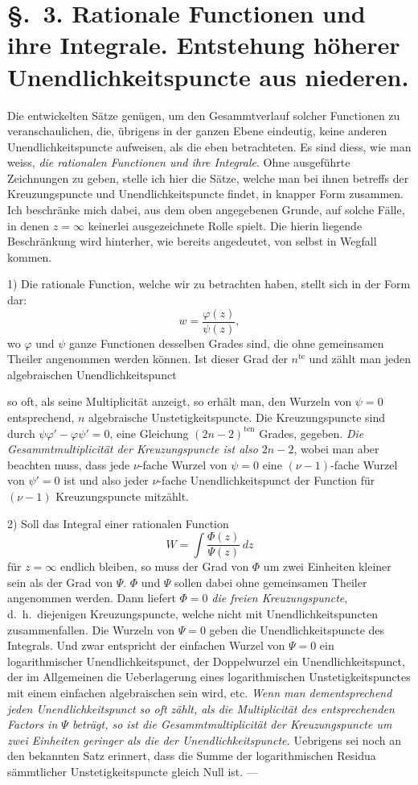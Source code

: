 \documentclass{article}
\begin{document}
\section*{§.~3. Rationale Functionen und ihre Integrale. Entstehung höherer Unendlichkeitspuncte aus niederen.}

Die entwickelten Sätze genügen, um den Gesammtverlauf solcher Functionen zu veranschaulichen, die, übrigens in der ganzen Ebene eindeutig, keine anderen Unendlichkeitspuncte aufweisen, als die eben betrachteten. Es sind diess, wie man weiss, \emph{die rationalen Functionen und ihre Integrale}. Ohne ausgeführte Zeichnungen zu geben, stelle ich hier die Sätze, welche man bei ihnen betreffs der Kreuzungspuncte und Unendlichkeitspuncte findet, in knapper Form zusammen. Ich beschränke mich dabei, aus dem oben angegebenen Grunde, auf solche Fälle, in denen $z = \infty$ keinerlei ausgezeichnete Rolle spielt. Die hierin liegende Beschränkung wird hinterher, wie bereits angedeutet, von selbst in Wegfall kommen.

1) Die rationale Function, welche wir zu betrachten haben, stellt sich in der Form dar:
\[ w = \frac{\varphi(z)}{\psi(z)}, \]
wo $\varphi$ und $\psi$ ganze Functionen desselben Grades sind, die ohne gemeinsamen Theiler angenommen werden können. Ist dieser Grad der $n^{\text{te}}$ und zählt man jeden algebraischen Unendlichkeitspunct

so oft, als seine Multiplicität anzeigt, so erhält man, den Wurzeln von $\psi = 0$ entsprechend, $n$ algebraische Unstetigkeitspuncte. Die Kreuzungspuncte sind durch $\psi\varphi' - \varphi\psi' = 0$, eine Gleichung $(2n - 2)^{\text{ten}}$ Grades, gegeben. \emph{Die Gesammtmultiplicität der Kreuzungspuncte ist also $2n - 2$}, wobei man aber beachten muss, dass jede $\nu$-fache Wurzel von $\psi = 0$ eine $(\nu - 1)$-fache Wurzel von $\psi' = 0$ ist und also jeder $\nu$-fache Unendlichkeitspunct der Function für $(\nu - 1)$ Kreuzungspuncte mitzählt.

2) Soll das Integral einer rationalen Function
\[ W = \int \frac{\Phi(z)}{\Psi(z)}\,dz \]
für $z = \infty$ endlich bleiben, so muss der Grad von $\Phi$ um zwei Einheiten kleiner sein als der Grad von $\Psi$. $\Phi$ und $\Psi$ sollen dabei ohne gemeinsamen Theiler angenommen werden. Dann liefert $\Phi = 0$ \emph{die freien Kreuzungspuncte}, d.\ h.\ diejenigen Kreuzungspuncte, welche nicht mit Unendlichkeitspuncten zusammenfallen. Die Wurzeln von $\Psi = 0$ geben die Unendlichkeitspuncte des Integrals. Und zwar entspricht der einfachen Wurzel von $\Psi = 0$ ein logarithmischer Unendlichkeitspunct, der Doppelwurzel ein Unendlichkeitspunct, der im Allgemeinen die Ueberlagerung eines logarithmischen Unstetigkeitspunctes mit einem einfachen algebraischen sein wird, etc. \emph{Wenn man dementsprechend jeden Unendlichkeitspunct so oft zählt, als die Multiplicität des entsprechenden Factors in $\Psi$ beträgt, so ist die Gesammtmultiplicität der Kreuzungspuncte um zwei Einheiten geringer als die der Unendlichkeitspuncte.} Uebrigens sei noch an den bekannten Satz erinnert, dass die Summe der logarithmischen Residua sämmtlicher Unstetigkeitspuncte gleich Null ist. ---
\end{document}
